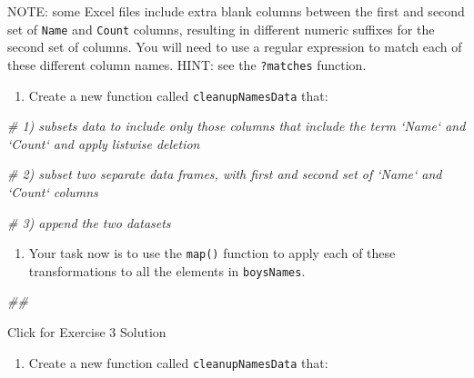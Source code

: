 \documentclass[]{book}
\newenvironment{Shaded}{\begin{snugshade}}{\end{snugshade}}
\newcommand{\CommentTok}[1]{\textcolor[rgb]{0.56,0.35,0.01}{\textit{#1}}}
\providecommand{\tightlist}{%
  \setlength{\itemsep}{0pt}\setlength{\parskip}{0pt}}
\begin{document}
NOTE: some Excel files include extra blank columns between the first and second
set of \texttt{Name} and \texttt{Count} columns, resulting in different numeric suffixes
for the second set of columns. You will need to use a regular expression
to match each of these different column names. HINT: see the \texttt{?matches}
function.

\begin{enumerate}
\def\labelenumi{\arabic{enumi}.}
\tightlist
\item
  Create a new function called \texttt{cleanupNamesData} that:
\end{enumerate}

\begin{Shaded}
\begin{Highlighting}[]
\CommentTok{# 1) subsets data to include only those columns that include the term `Name` and `Count` and apply listwise deletion}

\CommentTok{# 2) subset two separate data frames, with first and second set of `Name` and `Count` columns}

\CommentTok{# 3) append the two datasets}
\end{Highlighting}
\end{Shaded}

\begin{enumerate}
\def\labelenumi{\arabic{enumi}.}
\setcounter{enumi}{1}
\tightlist
\item
  Your task now is to use the \texttt{map()} function to apply each of these
  transformations to all the elements in \texttt{boysNames}.
\end{enumerate}

\begin{Shaded}
\begin{Highlighting}[]
\CommentTok{## }
\end{Highlighting}
\end{Shaded}

{Click for Exercise 3 Solution}

\begin{enumerate}
\def\labelenumi{\arabic{enumi}.}
\tightlist
\item
  Create a new function called \texttt{cleanupNamesData} that:
\end{enumerate}
\end{document}
